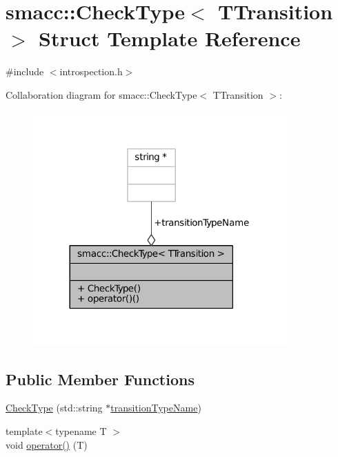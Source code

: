 \hypertarget{structsmacc_1_1CheckType}{}\section{smacc\+:\+:Check\+Type$<$ T\+Transition $>$ Struct Template Reference}
\label{structsmacc_1_1CheckType}


{\ttfamily \#include $<$introspection.\+h$>$}



Collaboration diagram for smacc\+:\+:Check\+Type$<$ T\+Transition $>$\+:
\nopagebreak
\begin{figure}[H]
\begin{center}
\leavevmode
\includegraphics[width=276pt]{structsmacc_1_1CheckType__coll__graph}
\end{center}
\end{figure}
\subsection*{Public Member Functions}
\begin{DoxyCompactItemize}
\item 
\hyperlink{structsmacc_1_1CheckType_a0123f874439e9da1c33a23cd7b33e413}{Check\+Type} (std\+::string $\ast$\hyperlink{structsmacc_1_1CheckType_a6402dc8352758d361781773dc1e8523f}{transition\+Type\+Name})
\item 
{\footnotesize template$<$typename T $>$ }\\void \hyperlink{structsmacc_1_1CheckType_aafa40f91456602c5cf5eda7c1f553f7b}{operator()} (T)
\end{DoxyCompactItemize}
